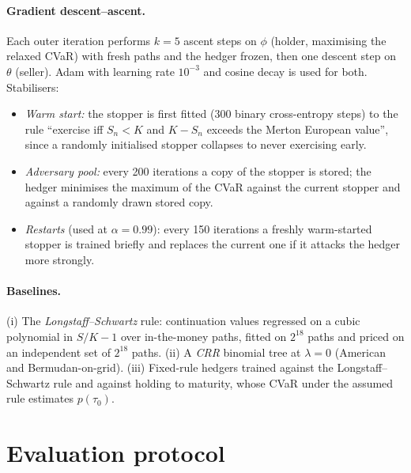 \documentclass[11pt]{article}
\theoremstyle{definition}
\theoremstyle{remark}
\begin{document}
\paragraph{Gradient descent--ascent.} Each outer iteration performs $k=5$ ascent steps on $\phi$ (holder,
maximising the relaxed CVaR) with fresh paths and the hedger frozen, then one descent step on $\theta$
(seller). Adam with learning rate $10^{-3}$ and cosine decay is used for both. Stabilisers:
\begin{itemize}[leftmargin=*]
\item \emph{Warm start:} the stopper is first fitted (300 binary cross-entropy steps) to the rule
  ``exercise iff $S_n<K$ and $K-S_n$ exceeds the Merton European value'', since a randomly initialised
  stopper collapses to never exercising early.
\item \emph{Adversary pool:} every 200 iterations a copy of the stopper is stored; the hedger minimises the
  maximum of the CVaR against the current stopper and against a randomly drawn stored copy.
\item \emph{Restarts} (used at $\alpha=0.99$): every 150 iterations a freshly warm-started stopper is
  trained briefly and replaces the current one if it attacks the hedger more strongly.
\end{itemize}

\paragraph{Baselines.} (i) The \emph{Longstaff--Schwartz} rule: continuation values regressed on a cubic
polynomial in $S/K-1$ over in-the-money paths, fitted on $2^{18}$ paths and priced on an independent set of
$2^{18}$ paths. (ii) A \emph{CRR} binomial tree at $\lambda=0$ (American and Bermudan-on-grid). (iii)
Fixed-rule hedgers trained against the Longstaff--Schwartz rule and against holding to maturity, whose
CVaR under the assumed rule estimates $p(\tau_0)$.

\section{Evaluation protocol}\label{sec:eval}
\end{document}
